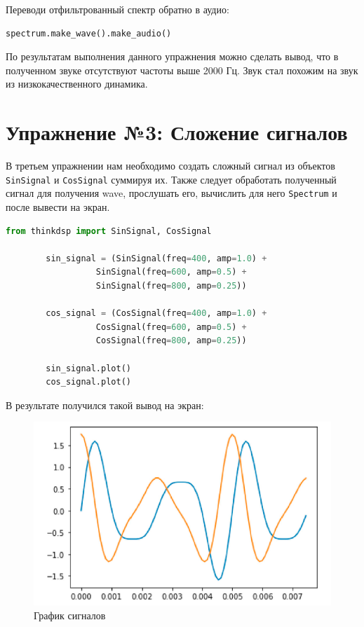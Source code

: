 \documentclass[a4]{article}
\begin{document}
    Переводи отфильтрованный спектр обратно в аудио:

    \begin{lstlisting}[language=Python, caption= Перевод в аудио, label={lst:spectr_to_wav}]
        spectrum.make_wave().make_audio()
    \end{lstlisting}

    По результатам выполнения данного упражнения можно сделать вывод, что в полученном звуке отсутствуют частоты выше 2000 Гц.
    Звук стал похожим на звук из низкокачественного динамика.

    \newpage


    \section{Упражнение №3: Сложение сигналов}
    \label{sec:3_sum_signal}
    В третьем упражнении нам необходимо создать сложный сигнал из объектов \texttt{SinSignal} и \texttt{CosSignal} суммируя их.
    Также следует обработать полученный сигнал для получения wave, прослушать его, вычислить для него \texttt{Spectrum} и после вывести на экран.

    \begin{lstlisting}[language=Python, caption= Создание сигналов, label={lst:gen_signal}]
        from thinkdsp import SinSignal, CosSignal

        sin_signal = (SinSignal(freq=400, amp=1.0) +
                  SinSignal(freq=600, amp=0.5) +
                  SinSignal(freq=800, amp=0.25))

        cos_signal = (CosSignal(freq=400, amp=1.0) +
                  CosSignal(freq=600, amp=0.5) +
                  CosSignal(freq=800, amp=0.25))

        sin_signal.plot()
        cos_signal.plot()
    \end{lstlisting}

    В результате получился такой вывод на экран:

    \begin{figure}[H]
        \centering
        \includegraphics[width=\textwidth]{signals}
        \caption{График сигналов}
        \label{fig:signals}
    \end{figure}
\end{document}
